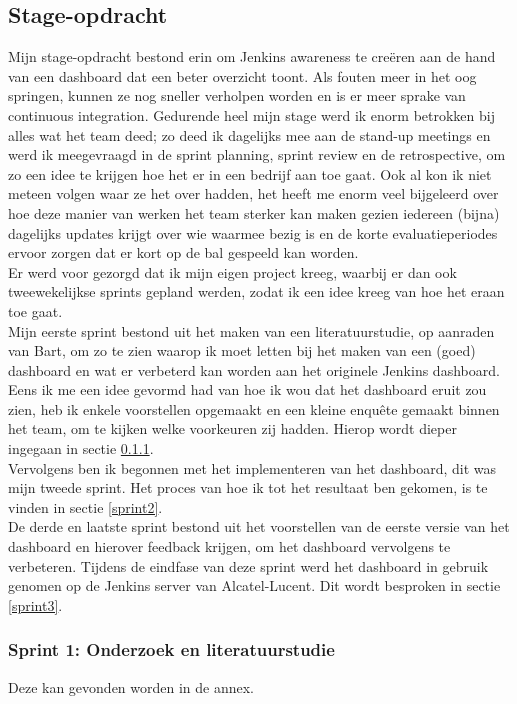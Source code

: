 \documentclass[10pt,a4paper]{article}
\begin{document}
\subsection{Stage-opdracht}
Mijn stage-opdracht bestond erin om Jenkins awareness te cre\"eren aan de hand van een dashboard dat een beter overzicht toont.
Als fouten meer in het oog springen, kunnen ze nog sneller verholpen worden en is er meer sprake van continuous integration.  Gedurende heel mijn stage werd ik enorm betrokken bij alles wat het team deed; zo deed ik dagelijks mee aan de stand-up meetings en werd ik meegevraagd in de sprint planning, sprint review en de retrospective, om zo een idee te krijgen hoe het er in een bedrijf aan toe gaat. Ook al kon ik niet meteen volgen waar ze het over hadden, het heeft me enorm veel bijgeleerd over hoe deze manier van werken het team sterker kan maken gezien iedereen (bijna) dagelijks updates krijgt over wie waarmee bezig is en de korte evaluatieperiodes ervoor zorgen dat er kort op de bal gespeeld kan worden.\\
Er werd voor gezorgd dat ik mijn eigen project kreeg, waarbij er dan ook tweewekelijkse sprints gepland werden, zodat ik een idee kreeg van hoe het eraan toe gaat.\\
Mijn eerste sprint bestond uit het maken van een literatuurstudie, op aanraden van Bart, om zo te zien waarop ik moet letten bij het maken van een (goed) dashboard en wat er verbeterd kan worden aan het originele Jenkins dashboard. Eens ik me een idee gevormd had van hoe ik wou dat het dashboard eruit zou zien, heb ik enkele voorstellen opgemaakt en een kleine enqu\^ete gemaakt binnen het team, om te kijken welke voorkeuren zij hadden. Hierop wordt dieper ingegaan in sectie \ref{sprint1}.\\
Vervolgens ben ik begonnen met het implementeren van het dashboard, dit was mijn tweede sprint. Het proces van hoe ik tot het resultaat ben gekomen, is te vinden in sectie \ref{sprint2}.\\
De derde en laatste sprint bestond uit het voorstellen van de eerste versie van het dashboard en hierover feedback krijgen, om het dashboard vervolgens te verbeteren. Tijdens de eindfase van deze sprint werd het dashboard in gebruik genomen op de Jenkins server van Alcatel-Lucent. Dit wordt besproken in sectie \ref{sprint3}.

\subsubsection{Sprint 1: Onderzoek en literatuurstudie} 
\label{sprint1}
Deze kan gevonden worden in de annex. \\
\end{document}
